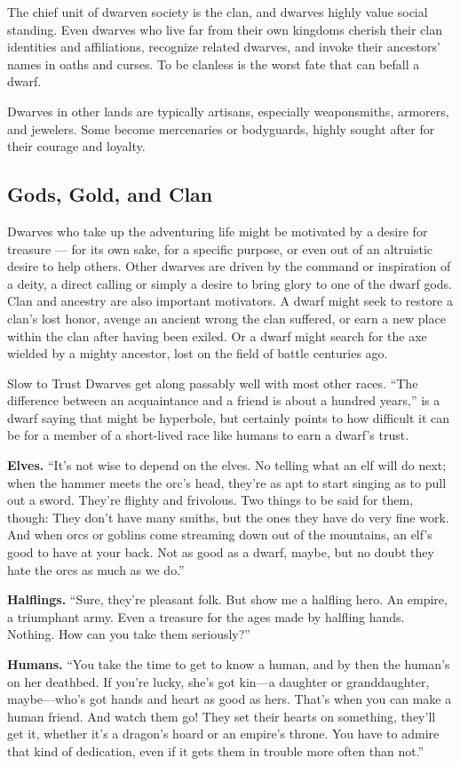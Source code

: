 The chief unit of dwarven society is the clan, and dwarves highly value social standing. Even dwarves who live far from their own kingdoms cherish their clan identities and affiliations, recognize related dwarves, and invoke their ancestors’ names in oaths and curses. To be clanless is the worst fate that can befall a dwarf.

Dwarves in other lands are typically artisans, especially weaponsmiths, armorers, and jewelers. Some become mercenaries or bodyguards, highly sought after for their courage and loyalty.

\subsection{Gods, Gold, and Clan}
Dwarves who take up the adventuring life might be motivated by a desire for treasure — for its own sake, for a specific purpose, or even out of an altruistic desire to help others. Other dwarves are driven by the command or inspiration of a deity, a direct calling or simply a desire to bring glory to one of the dwarf gods. Clan and ancestry are also important motivators. A dwarf might seek to restore a clan’s lost honor, avenge an ancient wrong the clan suffered, or earn a new place within the clan after having been exiled. Or a dwarf might search for the axe wielded by a mighty ancestor, lost on the field of battle centuries ago.

\begin{DndSidebar}[float=!b]{Slow to Trust}
Dwarves get along passably well with most other races. ``The difference between an acquaintance and a friend is about a hundred years,'' is a dwarf saying that might be hyperbole, but certainly points to how difficult it can be for a member of a short-lived race like humans to earn a dwarf’s trust.

\textbf{Elves.} ``It’s not wise to depend on the elves. No telling what an elf will do next; when the hammer meets the orc’s head, they’re as apt to start singing as to pull out a sword. They’re flighty and frivolous. Two things to be said for them, though: They don’t have many smiths, but the ones they have do very fine work. And when orcs or goblins come streaming down out of the mountains, an elf’s good to have at your back. Not as good as a dwarf, maybe, but no doubt they hate the orcs as much as we do.''

\textbf{Halflings.} ``Sure, they’re pleasant folk. But show me a halfling hero. An empire, a triumphant army. Even a treasure for the ages made by halfling hands. Nothing. How can you take them seriously?''

\textbf{Humans.} ``You take the time to get to know a human, and by then the human’s on her deathbed. If you’re lucky, she’s got kin—a daughter or granddaughter, maybe—who’s got hands and heart as good as hers. That’s when you can make a human friend. And watch them go! They set their hearts on something, they’ll get it, whether it’s a dragon’s hoard or an empire’s throne. You have to admire that kind of dedication, even if it gets them in trouble more often than not.''
\end{DndSidebar}

